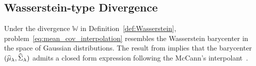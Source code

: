 \documentclass{article}
\begin{document}
\subsection{Wasserstein-type Divergence}
Under the divergence $\mathds W$ in Definition~\ref{def:Wasserstein}, problem~\eqref{eq:mean_cov_interpolation} resembles the Wasserstein barycenter in the space of Gaussian distributions. The result from \citet[\S6.2]{agueh2011barycenters} implies that the barycenter~$(\widehat {\mu}_\lambda, \widehat{\Sigma}_\lambda)$ admits a closed form expression following the McCann's interpolant~\citep[Example~1.7]{ref:mccann1997convexity}. 


\end{document}
